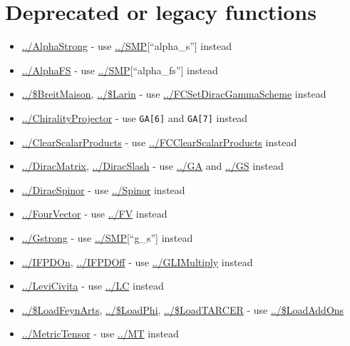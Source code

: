 \documentclass[../FeynCalcManual.tex]{subfiles}
\begin{document}
\hypertarget{deprecated or legacy functions}{
\section{Deprecated or legacy functions}\label{deprecated or legacy functions}}

\begin{itemize}
\tightlist
\item
  \hyperlink{../alphastrong}{../AlphaStrong} - use
  \hyperlink{../smp}{../SMP}{[}``alpha\_s''{]} instead
\item
  \hyperlink{../alphafs}{../AlphaFS} - use
  \hyperlink{../smp}{../SMP}{[}``alpha\_fs''{]} instead
\item
  \hyperlink{../dollarbreitmaison}{../\$BreitMaison},
  \hyperlink{../dollarlarin}{../\$Larin} - use
  \hyperlink{../fcsetdiracgammascheme}{../FCSetDiracGammaScheme} instead
\item
  \hyperlink{../chiralityprojector}{../ChiralityProjector} - use
  \texttt{GA[\allowbreak{}6]} and \texttt{GA[\allowbreak{}7]} instead
\item
  \hyperlink{../clearscalarproducts}{../ClearScalarProducts} - use
  \hyperlink{../fcclearscalarproducts}{../FCClearScalarProducts} instead
\item
  \hyperlink{../diracmatrix}{../DiracMatrix},
  \hyperlink{../diracslash}{../DiracSlash} - use
  \hyperlink{../ga}{../GA} and \hyperlink{../gs}{../GS} instead
\item
  \hyperlink{../diracspinor}{../DiracSpinor} - use
  \hyperlink{../spinor}{../Spinor} instead
\item
  \hyperlink{../fourvector}{../FourVector} - use
  \hyperlink{../fv}{../FV} instead
\item
  \hyperlink{../gstrong}{../Gstrong} - use
  \hyperlink{../smp}{../SMP}{[}``g\_s''{]} instead
\item
  \hyperlink{../ifpdon}{../IFPDOn}, \hyperlink{../ifpdoff}{../IFPDOff} -
  use \hyperlink{../glimultiply}{../GLIMultiply} instead
\item
  \hyperlink{../levicivita}{../LeviCivita} - use
  \hyperlink{../lc}{../LC} instead
\item
  \hyperlink{../dollarloadfeynarts}{../\$LoadFeynArts},
  \hyperlink{../dollarloadphi}{../\$LoadPhi},
  \hyperlink{../dollarloadtarcer}{../\$LoadTARCER} - use
  \hyperlink{../dollarloadaddons}{../\$LoadAddOns}
\item
  \hyperlink{../metrictensor}{../MetricTensor} - use
  \hyperlink{../mt}{../MT} instead

\end{itemize}
\end{document}
